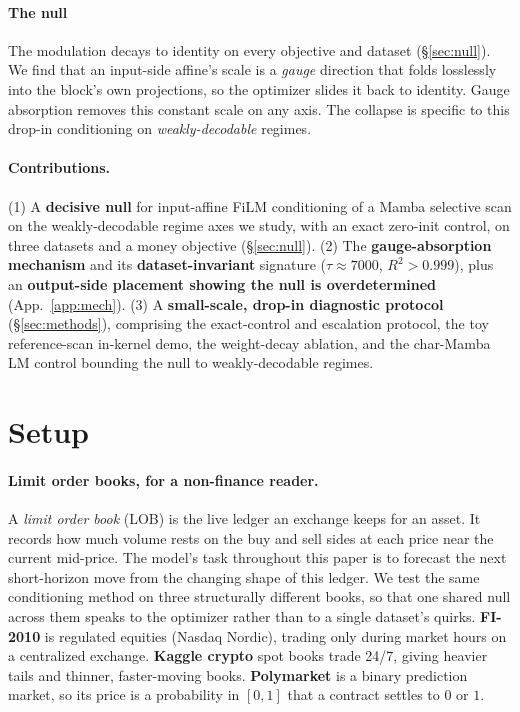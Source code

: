 \documentclass{article}
\begin{document}
\paragraph{The null}
The modulation decays to identity on every
objective and dataset (\S\ref{sec:null}). We find that an input-side affine's scale is a \emph{gauge} direction that folds
losslessly into the block's own projections, so the optimizer slides it back to
identity. Gauge absorption removes this constant scale on any axis. The collapse is specific to this drop-in conditioning on \emph{weakly-decodable} regimes.

\paragraph{Contributions.}
(1) A \textbf{decisive null} for input-affine FiLM conditioning of a
Mamba selective scan on the weakly-decodable regime axes we study, with an
exact zero-init control, on three datasets and a money
objective (\S\ref{sec:null}). (2) The \textbf{gauge-absorption mechanism} and its
\textbf{dataset-invariant} signature ($\tau\approx7000$, $R^2>0.999$), plus an
\textbf{output-side placement showing the null is overdetermined}
(App.~\ref{app:mech}). (3) A \textbf{small-scale, drop-in diagnostic protocol}
(\S\ref{sec:methods}), comprising the exact-control and escalation protocol, the toy
reference-scan in-kernel demo, the weight-decay ablation, and the char-Mamba LM
control bounding the null to weakly-decodable regimes.

\section{Setup}\label{sec:setup}

\paragraph{Limit order books, for a non-finance reader.}
A \emph{limit order book} (LOB) is the live ledger an exchange keeps for an asset.
It records how much volume rests on the buy and sell sides at each price near the
current mid-price. The model's task throughout this paper is to forecast the next short-horizon move
from the changing shape of this
ledger. We test the same conditioning method on three structurally different
books, so that one shared null across them speaks to the optimizer rather than to
a single dataset's quirks. \textbf{FI-2010} is regulated equities (Nasdaq Nordic), trading only during market hours on a
centralized exchange. \textbf{Kaggle crypto} spot books trade
24/7, giving heavier tails and thinner, faster-moving
books. \textbf{Polymarket} is a binary
prediction market, so its price is a probability in $[0,1]$ that a contract
settles to $0$ or $1$.
\end{document}
